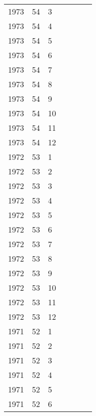 \begin{longtable}{ |l|l|l|l|p{2.7cm}|l|p{2cm}| }
 1973 & 54 &     3 &         &                &  & \\
 1973 & 54 &     4 &         &                &  & \\
 1973 & 54 &     5 &         &                &  & \\
 1973 & 54 &     6 &         &                &  & \\
 1973 & 54 &     7 &         &                &  & \\
 1973 & 54 &     8 &         &                &  & \\
 1973 & 54 &     9 &         &                &  & \\
 1973 & 54 &    10 &         &                &  & \\
 1973 & 54 &    11 &         &                &  & \\
 1973 & 54 &    12 &         &                &  & \\
 1972 & 53 &     1 &         &                &  & \\
 1972 & 53 &     2 &         &                &  & \\
 1972 & 53 &     3 &         &                &  & \\
 1972 & 53 &     4 &         &                &  & \\
 1972 & 53 &     5 &         &                &  & \\
 1972 & 53 &     6 &         &                &  & \\
 1972 & 53 &     7 &         &                &  & \\
 1972 & 53 &     8 &         &                &  & \\
 1972 & 53 &     9 &         &                &  & \\
 1972 & 53 &    10 &         &                &  & \\
 1972 & 53 &    11 &         &                &  & \\
 1972 & 53 &    12 &         &                &  & \\
 1971 & 52 &     1 &         &                &  & \\
 1971 & 52 &     2 &         &                &  & \\
 1971 & 52 &     3 &         &                &  & \\
 1971 & 52 &     4 &         &                &  & \\
 1971 & 52 &     5 &         &                &  & \\
 1971 & 52 &     6 &         &                &  & \\

\end{longtable}
